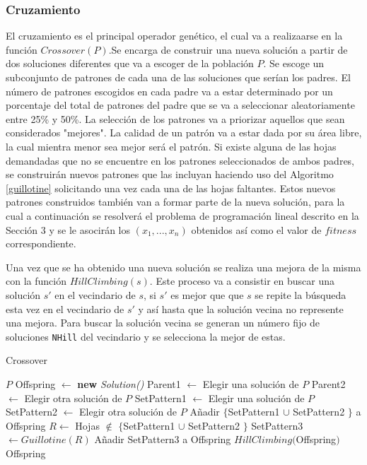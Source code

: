 \documentclass[a4paper,10pt,twocolumn]{article}
\begin{document}
\subsubsection{Cruzamiento}
El cruzamiento es el principal operador genético, el cual va a realizaarse en la función $Crossover(P)$.Se encarga de construir una nueva solución a partir de dos soluciones diferentes que va a escoger de la población $P$. Se escoge un subconjunto de patrones de cada una de las soluciones que serían los padres. El número de patrones escogidos en cada padre va a estar determinado  por un porcentaje del total de patrones del padre que se va a seleccionar aleatoriamente entre 25\% y 50\%. La selección de los patrones va a priorizar aquellos que sean considerados "mejores". La calidad de un patrón va a estar dada por su área libre, la cual mientra menor sea mejor será el patrón. Si existe alguna de las hojas demandadas que no se encuentre en los patrones seleccionados de ambos padres, se construirán nuevos patrones que las incluyan haciendo uso del Algoritmo \ref{guillotine} solicitando una vez cada una de las hojas faltantes. Estos nuevos patrones construidos también van a formar parte de la nueva solución, para la cual a continuación se resolverá el problema de programación lineal descrito en  la Sección 3 y se le asocirán los $(x_1,...,x_n)$ obtenidos así como el valor de $fitness$ correspondiente.

Una vez que se ha obtenido una nueva solución se realiza una mejora de la misma con la función $HillClimbing(s)$. Este proceso va a consistir en buscar una solución $s'$ en el vecindario de $s$, si $s'$ es mejor que que $s$ se repite la búsqueda esta vez en el vecindario de $s'$ y así hasta que la solución vecina no represente una mejora. Para buscar la solución vecina se generan un número fijo de soluciones \texttt{NHill} del vecindario y se selecciona la mejor de estas.     

\algrenewcommand{}
\algrenewcommand{}
\begin{algorithm}
	\caption{Crossover}\label{crossover}
	\begin{algorithmic}[1]
		\Require $P$
		\State Offspring $\gets$ \textbf{new} \textit{Solution()}
		\State Parent1 $\gets $ Elegir una solución de $P$
		\State Parent2 $\gets $ Elegir otra solución de $P$
		\State SetPattern1 $\gets $ Elegir una solución de $P$
		\State SetPattern2 $\gets $ Elegir otra solución de $P$
		\State Añadir $\{$SetPattern1 $\cup$ SetPattern2 $\}$ a Offspring
		\State $R \gets $ Hojas $\notin $ $\{$SetPattern1 $\cup$ SetPattern2
		$\}$
		\State SetPattern3 $\gets Guillotine(R)$ 
		\State Añadir SetPattern3 a Offspring
		\State $ HillClimbing($Offspring$)$\\
		\Return Offspring 
	\end{algorithmic}
\end{algorithm}
\end{document}
